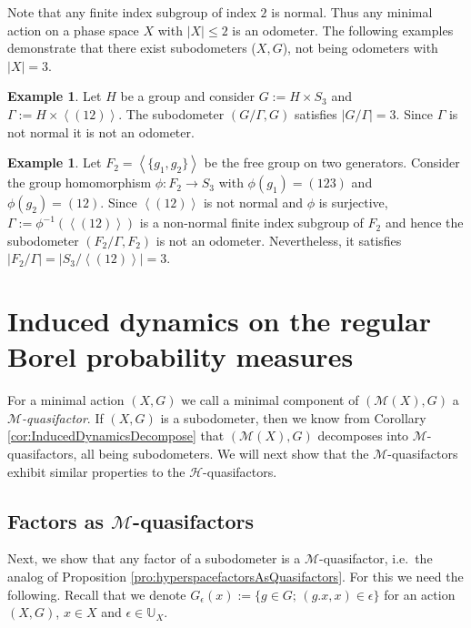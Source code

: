 \documentclass[12pt, reqno]{amsart}
\theoremstyle{definition}
\newtheorem{example}[theorem]{Example}
\theoremstyle{remark}
\numberwithin{equation}{section}
\theoremstyle{theorem}
\theoremstyle{remark}
\newcommand{\grouphull}[1]{\left\langle #1 \right\rangle}
\def\hyper{{\mathcal{H}}}
\begin{document}
Note that any finite index subgroup of index $2$ is normal. Thus any minimal action on a phase space $X$ with $|X|\leq 2$ is an odometer. 
The following examples demonstrate that there exist subodometers ($X,G$), not being odometers with $|X|=3$. 

\begin{example}
    Let $H$ be a group and consider $G:=H\times S_3$ and $\Gamma:=H\times \grouphull{(12)}$. 
    The subodometer $(G/\Gamma,G)$ satisfies $|G/\Gamma|=3$. 
    Since $\Gamma$ is not normal it is not an odometer. 
\end{example}

\begin{example}
    Let $F_2=\grouphull{\{g_1,g_2\}}$ be the free group on two generators. 
    Consider the group homomorphism $\phi\colon F_2\to S_3$ with $\phi(g_1)=(123)$ and $\phi(g_2)=(12)$. 
    Since $\grouphull{(12)}$ is not normal and $\phi$ is surjective, $\Gamma:=\phi^{-1}(\grouphull{(12)})$ is a non-normal finite index subgroup of $F_2$ and hence the subodometer $(F_2/\Gamma,F_2)$ is not an odometer.
    Nevertheless, it satisfies $|F_2/\Gamma|=|S_3/\grouphull{(12)}|=3$. 
\end{example}

















\section{Induced dynamics on the regular Borel probability measures}
\label{sec:inducedDynamicsOnTheRegularBorelProbabilityMeasures}
For a minimal action $(X,G)$ we call a minimal component of $(\mathcal{M}(X),G)$ a \linebreak \emph{$\mathcal{M}$-quasifactor}. 
If $(X,G)$ is a subodometer, then we know from Corollary \ref{cor:InducedDynamicsDecompose} that $(\mathcal{M}(X),G)$ decomposes into $\mathcal{M}$-quasifactors, all being subodometers. 
We will next show that the $\mathcal{M}$-quasifactors exhibit similar properties to the $\hyper$-quasifactors. 



\subsection{Factors as $\mathcal{M}$-quasifactors}
\label{subsec:inducedDynamicsOnTheRegularBorelProbabilityMeasures_FactorsAsMQuasifactors}
Next, we show that any factor of a subodometer is a $\mathcal{M}$-quasifactor, i.e.\ the analog of Proposition \ref{pro:hyperspacefactorsAsQuasifactors}. 
For this we need the following. Recall that we denote $G_\epsilon(x):=\{g\in G;\, (g.x,x)\in \epsilon\}$ 
for an action $(X,G)$, $x\in X$ and $\epsilon\in \mathbb{U}_X$. 
\end{document}
